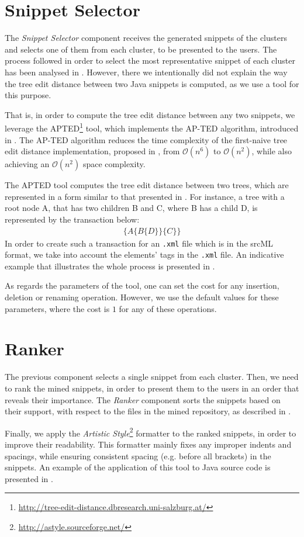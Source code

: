 \section{Snippet Selector}
\label{sec:snippet-selector}

The \textit{Snippet Selector} component receives the generated snippets of the clusters and selects one of them from each cluster, to be presented to the users. The process followed in order to select the most representative snippet of each cluster has been analysed in . However, there we intentionally did not explain the way the tree edit distance between two Java snippets is computed, as we use a tool for this purpose.

That is, in order to compute the tree edit distance between any two snippets, we leverage the APTED\footnote{\url{http://tree-edit-distance.dbresearch.uni-salzburg.at/}} tool, which implements the AP-TED algorithm, introduced in \cite{Pawlik:2016}. The AP-TED algorithm reduces the time complexity of the first-naive tree edit distance implementation, proposed in \cite{Tai:1979}, from $\mathcal{O}(n^6)$ to $\mathcal{O}(n^2)$, while also achieving an $\mathcal{O}(n^2)$ space complexity.

The APTED tool computes the tree edit distance between two trees, which are represented in a form similar to that presented in . For instance, a tree with a root node A, that has two children B and C, where B has a child D, is represented by the transaction below:
%
\begin{align*}
\{A\{B\{D\}\}\{C\}\}
\end{align*}
%
In order to create such a transaction for an \texttt{.xml} file which is in the srcML format, we take into account the elements' tags in the \texttt{.xml} file. An indicative example that illustrates the whole process is presented in .

As regards the parameters of the tool, one can set the cost for any insertion, deletion or renaming operation. However, we use the default values for these parameters, where the cost is $1$ for any of these operations.


\section{Ranker}
\label{sec:ranker}

The previous component selects a single snippet from each cluster. Then, we need to rank the mined snippets, in order to present them to the users in an order that reveals their importance. The \textit{Ranker} component sorts the snippets based on their support, with respect to the files in the mined repository, as described in .

Finally, we apply the \textit{Artistic Style}\footnote{\url{http://astyle.sourceforge.net/}} formatter to the ranked snippets, in order to improve their readability. This formatter mainly fixes any improper indents and spacings, while ensuring consistent spacing (e.g. before all brackets) in the snippets. An example of the application of this tool to Java source code is presented in .